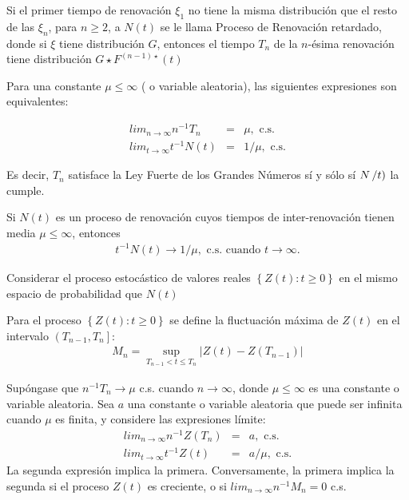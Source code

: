 \begin{Note}
Si el primer tiempo de renovaci\'on $\xi_{1}$ no tiene la misma distribuci\'on que el resto de las $\xi_{n}$, para $n\geq2$, a $N\left(t\right)$ se le llama Proceso de Renovaci\'on retardado, donde si $\xi$ tiene distribuci\'on $G$, entonces el tiempo $T_{n}$ de la $n$-\'esima renovaci\'on tiene distribuci\'on $G\star F^{\left(n-1\right)\star}\left(t\right)$
\end{Note}


\begin{Teo}
Para una constante $\mu\leq\infty$ ( o variable aleatoria), las siguientes expresiones son equivalentes:

\begin{eqnarray}
lim_{n\rightarrow\infty}n^{-1}T_{n}&=&\mu,\textrm{ c.s.}\\
lim_{t\rightarrow\infty}t^{-1}N\left(t\right)&=&1/\mu,\textrm{ c.s.}
\end{eqnarray}
\end{Teo}


Es decir, $T_{n}$ satisface la Ley Fuerte de los Grandes N\'umeros s\'i y s\'olo s\'i $N\left/t\right)$ la cumple.


\begin{Coro}
Si $N\left(t\right)$ es un proceso de renovaci\'on cuyos tiempos de inter-renovaci\'on tienen media $\mu\leq\infty$, entonces
\begin{eqnarray}
t^{-1}N\left(t\right)\rightarrow 1/\mu,\textrm{ c.s. cuando }t\rightarrow\infty.
\end{eqnarray}

\end{Coro}


Considerar el proceso estoc\'astico de valores reales $\left\{Z\left(t\right):t\geq0\right\}$ en el mismo espacio de probabilidad que $N\left(t\right)$

\begin{Def}
Para el proceso $\left\{Z\left(t\right):t\geq0\right\}$ se define la fluctuaci\'on m\'axima de $Z\left(t\right)$ en el intervalo $\left(T_{n-1},T_{n}\right]$:
\begin{eqnarray*}
M_{n}=\sup_{T_{n-1}<t\leq T_{n}}|Z\left(t\right)-Z\left(T_{n-1}\right)|
\end{eqnarray*}
\end{Def}

\begin{Teo}
Sup\'ongase que $n^{-1}T_{n}\rightarrow\mu$ c.s. cuando $n\rightarrow\infty$, donde $\mu\leq\infty$ es una constante o variable aleatoria. Sea $a$ una constante o variable aleatoria que puede ser infinita cuando $\mu$ es finita, y considere las expresiones l\'imite:
\begin{eqnarray}
lim_{n\rightarrow\infty}n^{-1}Z\left(T_{n}\right)&=&a,\textrm{ c.s.}\\
lim_{t\rightarrow\infty}t^{-1}Z\left(t\right)&=&a/\mu,\textrm{ c.s.}
\end{eqnarray}
La segunda expresi\'on implica la primera. Conversamente, la primera implica la segunda si el proceso $Z\left(t\right)$ es creciente, o si $lim_{n\rightarrow\infty}n^{-1}M_{n}=0$ c.s.
\end{Teo}

